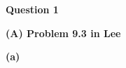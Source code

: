 \documentclass[10pt]{article}
\begin{document}
\textbf{Question 1}

\textbf{(A) Problem 9.3 in Lee}

\textbf{(a)} 
\end{document}

